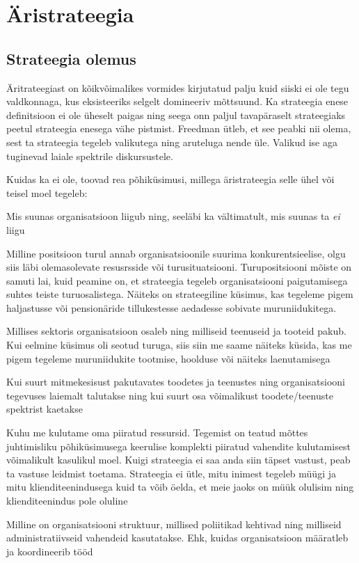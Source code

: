 \chapter{Äristrateegia}
\section{Strateegia olemus}
Äritrateegiast on kõikvõimalikes vormides kirjutatud palju kuid siiski ei ole tegu valdkonnaga, kus eksisteeriks selgelt domineeriv mõttsuund. Ka strateegia enese definitsioon ei ole üheselt paigas ning seega onn paljul tavapäraselt strateegiaks peetul strateegia enesega vähe pistmist\cite{de2006strategy}. Freedman ütleb, et see peabki nii olema, sest ta strateegia tegeleb valikutega ning aruteluga nende üle. Valikud ise aga tuginevad laiale spektrile diskursustele.\cite{freedman2013strategy} 

Kuidas ka ei ole, \citeauthor{de2006strategy, rumelt1991strategic} toovad rea põhiküsimusi\cite{rumelt1991strategic}, millega äristrateegia selle ühel või teisel moel tegeleb:
\begin{description}
	\item[Eesmärgid] Mis suunas organisatsioon liigub ning, seeläbi ka vältimatult, mis suunas ta \emph{ei} liigu
	\item[Positsioon] Milline positsioon turul annab organisatsioonile suurima konkurentsieelise, olgu siis läbi olemasolevate resusrsside või turusituatsiooni. Turupositsiooni mõiste on samuti lai, kuid peamine on, et strateegia tegeleb organisatsiooni paigutamisega suhtes teiste turuosalistega. Näiteks on strateegiline küsimus, kas tegeleme pigem haljastusse või pensionäride tillukestesse aedadesse sobivate muruniidukitega.
	\item[Pakutavad tooted ja teenused] Millises sektoris organisatsioon osaleb ning milliseid teenuseid ja tooteid pakub. Kui eelmine küsimus oli seotud turuga, siis siin me saame näiteks küsida, kas me pigem tegeleme muruniidukite tootmise, hoolduse või näiteks laenutamisega
	\item[Tegevusulatus ja mitmekesisus] Kui suurt mitmekesisust pakutavates toodetes ja teenustes ning organisatsiooni tegevuses laiemalt talutakse ning kui suurt osa võimalikust toodete/teenuste spektrist kaetakse
	\item[Ressursside suunamine] Kuhu me kulutame oma piiratud ressursid. Tegemist on teatud mõttes juhtimisliku põhiküsimusega keerulise komplekti piiratud vahendite kulutamisest võimalikult kasulikul moel. Kuigi strateegia ei saa anda siin täpset vastust, peab ta vastuse leidmist toetama. Strateegia ei ütle, mitu inimest tegeleb müügi ja mitu klienditeenindusega kuid ta võib öelda, et meie jaoks on müük olulisim ning klienditeenindus pole oluline
	\item[Organisatsiooni disain] Milline on organisatsiooni struktuur, millised poliitikad kehtivad ning milliseid administratiivseid vahendeid kasutatakse. Ehk, kuidas organisatsioon määratleb ja koordineerib tööd
\end{description}



